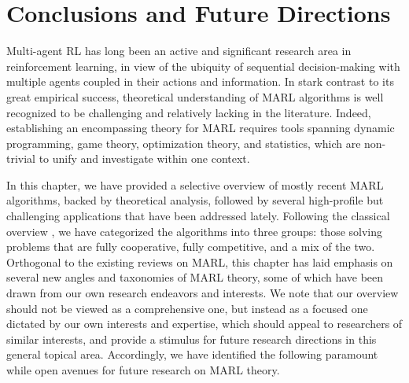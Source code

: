\section{Conclusions and  Future  Directions}\label{sec:conclusion}

Multi-agent RL has long been an active and significant research area in reinforcement learning, in view of the  ubiquity of  sequential decision-making with multiple agents coupled in their actions and information. In stark contrast to its great empirical success, theoretical understanding of MARL algorithms is well recognized  to be challenging and relatively lacking in the literature. Indeed,  establishing an encompassing theory for MARL requires tools spanning  dynamic programming, game theory, optimization theory, and statistics, which are  non-trivial  to unify and investigate within one context. 

In this chapter, we have provided a selective overview of mostly recent MARL algorithms, backed by   theoretical analysis, followed by several high-profile but challenging applications that have been addressed lately. Following  the classical overview \cite{bu2008comprehensive}, we have categorized the algorithms into three groups: those solving problems that are  fully cooperative, fully competitive, and a mix of the two.  Orthogonal to the existing reviews on MARL, this chapter has laid emphasis on several new angles and taxonomies of MARL theory,  some of which have been drawn  from our own research endeavors and interests. We note that our overview  should not be viewed  as a  comprehensive one, but instead as a focused one dictated by our own interests and expertise,  which should appeal to  researchers of similar interests, and provide  a stimulus for  future research directions in this general topical area.  Accordingly, we have identified 
 the following paramount while open  avenues for future research on MARL theory.   
 
